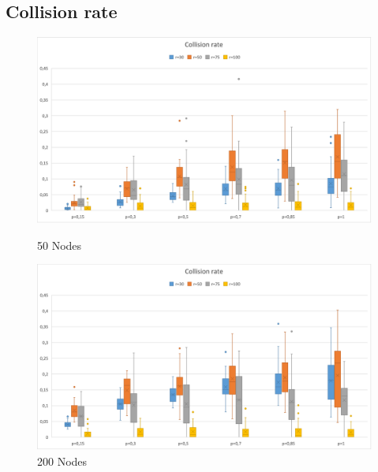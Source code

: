 \subsection{Collision rate}
\begin{figure}[H]
  \includegraphics[width=\linewidth]{./images/Collision50Boxplot.png}
  \caption{50 Nodes}\label{fig:awesome_image1}
\endminipage\hfill
{}
  \includegraphics[width=\linewidth]{./images/Collision200Boxplot.png}
  \caption{200 Nodes}\label{fig:collisions-200}
\endminipage
\end{figure}

